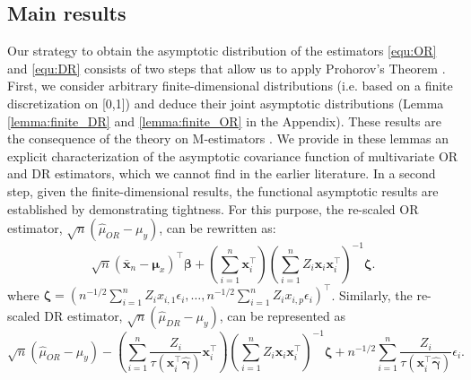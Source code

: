 \documentclass[12pt, A4]{article}
\newcommand{\SumOverN}{\sum_{i=1}^n}
\newcommand{\ObsCov}{\textbf{x}_i}
\newcommand{\LogCoe}{\boldsymbol{\gamma}}
\newcommand{\Parentheses}[1]{ \left( #1 \right) }
\begin{document}
        \subsection{Main results}
        Our strategy to obtain the asymptotic distribution of the estimators \eqref{equ:OR} and \eqref{equ:DR} consists of two steps that allow us to apply Prohorov's Theorem \cite[see][Sect. 5, p.57]{Bill79}. 
        First, we consider arbitrary finite-dimensional distributions (i.e. based on a finite discretization on [0,1]) and deduce their joint asymptotic distributions (Lemma \ref{lemma:finite_DR} and \ref{lemma:finite_OR} in the Appendix). 
        These results are the consequence of the theory on M-estimators \cite{NEWEY19942111}. 
        We provide in these lemmas an explicit characterization of the asymptotic covariance function of multivariate OR and DR estimators, which we cannot find in the earlier literature.
        In a second step, given the finite-dimensional results, the functional asymptotic results are established by demonstrating tightness. 
        For this purpose, the re-scaled OR estimator, $\sqrt{n}\Parentheses{\hat{\mu}_{OR} - \mu_y}$, can be rewritten as:
            \begin{equation} \label{OR}
                 \sqrt{n}\Parentheses{\bar{\textbf{x}}_n - \boldsymbol{\mu}_x}^{\top}\boldsymbol{\beta}
                 + \Parentheses{\SumOverN \textbf{x}_i ^{\top}} \Parentheses{\SumOverN Z_i\textbf{x}_i\textbf{x}_i^{\top}}^{-1} \boldsymbol{\zeta} .
            \end{equation}
        where $\boldsymbol{\zeta} = \Parentheses{ n^{-1/2} \SumOverN{ Z_ix_{i,1} \epsilon_i },\dots, n^{-1/2} \SumOverN{ Z_ix_{i,p} \epsilon_i } }^{\top}$.
        Similarly, the re-scaled DR estimator, $\sqrt{n}\Parentheses{\hat{\mu}_{DR} - \mu_y}$, can be represented as
            \begin{equation} \label{DR}
                \sqrt{n}\Parentheses{\hat{\mu}_{OR} - \mu_y} 
                 - \Parentheses{\SumOverN \frac{Z_i}{\tau(\ObsCov^{\top}\hat{\LogCoe})} \textbf{x}_i ^{\top}} \Parentheses{\SumOverN Z_i\textbf{x}_i\textbf{x}_i^{\top}}^{-1} \boldsymbol{\zeta} + n^{-1/2} \SumOverN \frac{Z_i}{\tau(\ObsCov^{\top}\hat{\LogCoe})}\epsilon_i.
            \end{equation}
\end{document}
